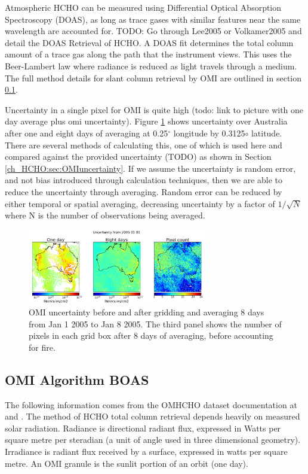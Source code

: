    Atmospheric HCHO can be measured using Differential Optical Absorption Spectroscopy (DOAS), as long as trace gases with similar features near the same wavelength are accounted for.
    TODO: Go through Lee2005 or Volkamer2005 and detail the DOAS Retrieval of HCHO.
    A DOAS fit determines the total column amount of a trace gas along the path that the instrument views.
    This uses the Beer-Lambert law where radiance is reduced as light travels through a medium.
    The full method details for slant column retrieval by OMI are outlined in section \ref{ch_HCHO:sec:OMI_BOAS}.
    
    Uncertainty in a single pixel for OMI is quite high (todo: link to picture with one day average plus omi uncertainty).
    Figure \ref{ch_HCHO:fig:eightDayUncertainty} shows uncertainty over Australia after one and eight days of averaging at 0.25$^{\circ}$ longitude by 0.3125${\circ}$ latitude.
    There are several methods of calculating this, one of which is used here and compared against the provided uncertainty (TODO) as shown in Section \ref{ch_HCHO:sec:OMIuncertainty}.
    If we assume the uncertainty is random error, and not bias introduced through calculation techniques, then we are able to reduce the uncertainty through averaging.
    Random error can be reduced by either temporal or spatial averaging, decreasing uncertainty by a factor of $1/\sqrt{N}$ where N is the number of observations being averaged.
    
    \begin{figure}[!htbp]
      \includegraphics[width=0.7\textwidth]{Figures/HCHO/Uncertainty.png}
      \caption{%
	      OMI uncertainty before and after gridding and averaging 8 days from Jan 1 2005 to Jan 8 2005.
	      The third panel shows the number of pixels in each grid box after 8 days of averaging, before accounting for fire.
      }
      \label{ch_HCHO:fig:eightDayUncertainty}
    \end{figure}
    
  \subsection{OMI Algorithm BOAS}
    \label{ch_HCHO:sec:OMI_BOAS}
    The following information comes from the OMHCHO dataset documentation at \citet{Kurosu2014} and \citet{Chance2002}.
    The method of HCHO total column retrieval depends heavily on measured solar radiation.
    Radiance is directional radiant flux, expressed in Watts per square metre per steradian (a unit of angle used in three dimensional geometry).
    Irradiance is radiant flux received by a surface, expressed in watts per square metre.
    An OMI granule is the sunlit portion of an orbit (one day).
    
